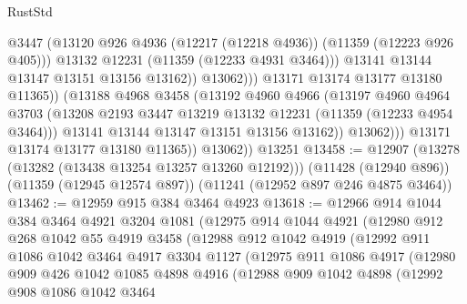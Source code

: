 \begin{lexlean}{RustStd}
\begin{coremodule}
{{{{{{{{{{{{{{{{{{{                                @3447
                                (@13120
                                  @926
                                  @4936
                                  (@12217 (@12218 @4936))
                                  (@11359 (@12223 @926 @405)))
                                @13132
                                @12231
                                (@11359 (@12233 @4931 @3464)))
                              @13141
                              @13144
                              @13147
                              @13151
                              @13156
                              @13162))
                          @13062)))
                    @13171
                    @13174
                    @13177
                    @13180
                    @11365))
                (@13188
                  @4968
                  @3458
                  (@13192
                    @4960
                    @4966
                    (@13197
                      @4960
                      @4964
                      @3703
                      (@13208 @2193 @3447 @13219 @13132 @12231 (@11359 (@12233 @4954 @3464)))
                      @13141
                      @13144
                      @13147
                      @13151
                      @13156
                      @13162))
                  @13062)))
            @13171
            @13174
            @13177
            @13180
            @11365))
        @13062))
    @13251
@13458 := @12907
    (@13278 (@13282 (@13438 @13254 @13257 @13260 @12192)))
    (@11428 (@12940 @896))
    (@11359 (@12945 @12574 @897))
    (@11241 (@12952 @897 @246 @4875 @3464))
@13462 := @12959 @915 @384 @3464 @4923
@13618 := @12966
    @914
    @1044
    @384
    @3464
    @4921
    @3204
    @1081
    (@12975
      @914
      @1044
      @4921
      (@12980
        @912
        @268
        @1042
        @55
        @4919
        @3458
        (@12988
          @912
          @1042
          @4919
          (@12992
            @911
            @1086
            @1042
            @3464
            @4917
            @3304
            @1127
            (@12975
              @911
              @1086
              @4917
              (@12980
                @909
                @426
                @1042
                @1085
                @4898
                @4916
                (@12988
                  @909
                  @1042
                  @4898
                  (@12992
                    @908
                    @1086
                    @1042
                    @3464
}}}}}}}}}}}}}}}}}}}
\end{coremodule}
\end{lexlean}
